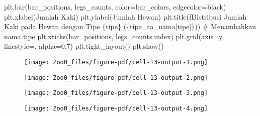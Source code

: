 \documentclass[
  letterpaper,
]{krantz}
\makeatletter
\newenvironment{Shaded}{\begin{snugshade}}{\end{snugshade}}
\newcommand{\CommentTok}[1]{\textcolor[rgb]{0.37,0.37,0.37}{#1}}
\newcommand{\FloatTok}[1]{\textcolor[rgb]{0.68,0.00,0.00}{#1}}
\newcommand{\NormalTok}[1]{\textcolor[rgb]{0.00,0.23,0.31}{#1}}
\newcommand{\OperatorTok}[1]{\textcolor[rgb]{0.37,0.37,0.37}{#1}}
\newcommand{\SpecialCharTok}[1]{\textcolor[rgb]{0.37,0.37,0.37}{#1}}
\newcommand{\SpecialStringTok}[1]{\textcolor[rgb]{0.13,0.47,0.30}{#1}}
\newcommand{\StringTok}[1]{\textcolor[rgb]{0.13,0.47,0.30}{#1}}
\newenvironment{kframe}{%
\medskip{}
\setlength{\fboxsep}{.8em}
 \def\at@end@of@kframe{}%
 \ifinner\ifhmode%
  \def\at@end@of@kframe{\end{minipage}}%
  \begin{minipage}{\columnwidth}%
 \fi\fi%
 \def\FrameCommand##1{\hskip\@totalleftmargin \hskip-\fboxsep
 \colorbox{shadecolor}{##1}\hskip-\fboxsep
     \hskip-\linewidth \hskip-\@totalleftmargin \hskip\columnwidth}%
 \MakeFramed {\advance\hsize-\width
   \@totalleftmargin\z@ \linewidth\hsize
   \@setminipage}}%
 {\par\unskip\endMakeFramed%
 \at@end@of@kframe}
\renewenvironment{Shaded}{\begin{kframe}}{\end{kframe}}
\makeatother
\begin{document}
\begin{Shaded}
\begin{Highlighting}[]
\NormalTok{    plt.bar(bar\_positions, legs\_counts, color}\OperatorTok{=}\NormalTok{bar\_colors, edgecolor}\OperatorTok{=}\StringTok{\textquotesingle{}black\textquotesingle{}}\NormalTok{)}
\NormalTok{    plt.xlabel(}\StringTok{\textquotesingle{}Jumlah Kaki\textquotesingle{}}\NormalTok{)}
\NormalTok{    plt.ylabel(}\StringTok{\textquotesingle{}Jumlah Hewan\textquotesingle{}}\NormalTok{)}
\NormalTok{    plt.title(}\SpecialStringTok{f\textquotesingle{}Distribusi Jumlah Kaki pada Hewan dengan Tipe }\SpecialCharTok{\{}\NormalTok{tipe}\SpecialCharTok{\}}\SpecialStringTok{ (}\SpecialCharTok{\{}\NormalTok{tipe\_to\_nama[tipe]}\SpecialCharTok{\}}\SpecialStringTok{)\textquotesingle{}}\NormalTok{)  }\CommentTok{\# Menambahkan nama tipe}
\NormalTok{    plt.xticks(bar\_positions, legs\_counts.index)}
\NormalTok{    plt.grid(axis}\OperatorTok{=}\StringTok{\textquotesingle{}y\textquotesingle{}}\NormalTok{, linestyle}\OperatorTok{=}\StringTok{\textquotesingle{}{-}{-}\textquotesingle{}}\NormalTok{, alpha}\OperatorTok{=}\FloatTok{0.7}\NormalTok{)}
\NormalTok{    plt.tight\_layout()}
\NormalTok{    plt.show()}
\end{Highlighting}
\end{Shaded}

\begin{figure}[H]

{\centering \texttt{[image: Zoo0\_files/figure-pdf/cell-13-output-1.png]}

}

\end{figure}

\begin{figure}[H]

{\centering \texttt{[image: Zoo0\_files/figure-pdf/cell-13-output-2.png]}

}

\end{figure}

\begin{figure}[H]

{\centering \texttt{[image: Zoo0\_files/figure-pdf/cell-13-output-3.png]}

}

\end{figure}

\begin{figure}[H]

{\centering \texttt{[image: Zoo0\_files/figure-pdf/cell-13-output-4.png]}

}

\end{figure}
\end{document}
